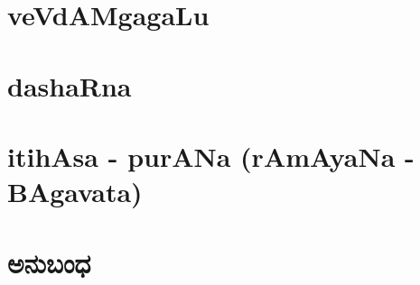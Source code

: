 \documentclass[twoside,openany]{book}
\begin{document}
\fontsize{12}{14}\selectfont

\frontmatter





\newpage


\newpage






\tableofcontents
\newpage

\mainmatter

%

\part*{veVdAMgagaLu}




\part*{dashaRna}




\setcounter{chapter}{5}





\part*{itihAsa - purANa (rAmAyaNa - BAgavata)}






\part*{ಅನುಬಂಧ}


\end{document}
